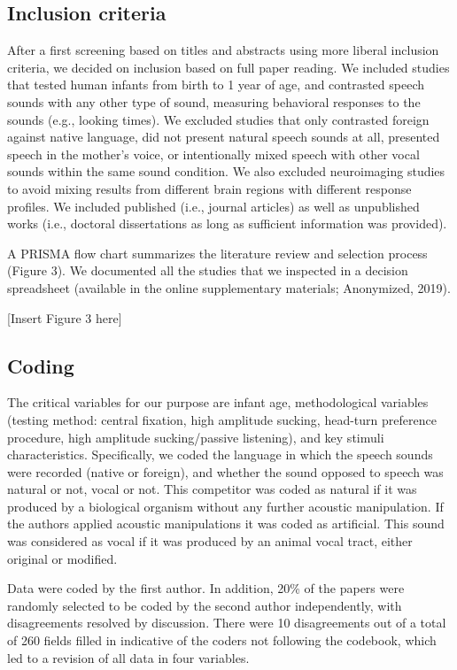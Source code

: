 \documentclass[man]{apa6}
\begin{document}
\subsection{Inclusion criteria}\label{inclusion-criteria}

After a first screening based on titles and abstracts using more liberal
inclusion criteria, we decided on inclusion based on full paper reading.
We included studies that tested human infants from birth to 1 year of
age, and contrasted speech sounds with any other type of sound,
measuring behavioral responses to the sounds (e.g., looking times). We
excluded studies that only contrasted foreign against native language,
did not present natural speech sounds at all, presented speech in the
mother's voice, or intentionally mixed speech with other vocal sounds
within the same sound condition. We also excluded neuroimaging studies
to avoid mixing results from different brain regions with different
response profiles. We included published (i.e., journal articles) as
well as unpublished works (i.e., doctoral dissertations as long as
sufficient information was provided).

A PRISMA flow chart summarizes the literature review and selection
process (Figure 3). We documented all the studies that we inspected in a
decision spreadsheet (available in the online supplementary materials;
Anonymized, 2019).

{[}Insert Figure 3 here{]}

\subsection{Coding}\label{coding}

The critical variables for our purpose are infant age, methodological
variables (testing method: central fixation, high amplitude sucking,
head-turn preference procedure, high amplitude sucking/passive
listening), and key stimuli characteristics. Specifically, we coded the
language in which the speech sounds were recorded (native or foreign),
and whether the sound opposed to speech was natural or not, vocal or
not. This competitor was coded as natural if it was produced by a
biological organism without any further acoustic manipulation. If the
authors applied acoustic manipulations it was coded as artificial. This
sound was considered as vocal if it was produced by an animal vocal
tract, either original or modified.

Data were coded by the first author. In addition, 20\% of the papers
were randomly selected to be coded by the second author independently,
with disagreements resolved by discussion. There were 10 disagreements
out of a total of 260 fields filled in indicative of the coders not
following the codebook, which led to a revision of all data in four
variables.
\end{document}
